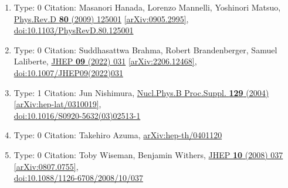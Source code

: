 \documentclass[a4paper,10pt]{article}
\begin{document}
\begin{enumerate}
\begin{enumerate}
  \item Type: 0 Citation: Masanori Hanada, Lorenzo Mannelli, Yoshinori Matsuo, \href{https://www.doi.org/10.1103/PhysRevD.80.125001}{Phys.Rev.D {\bf 80} (2009) 125001}  \href{https://arxiv.org/abs/0905.2995}{[arXiv:0905.2995]},\\\href{https://www.doi.org/10.1103/PhysRevD.80.125001}{doi:10.1103/PhysRevD.80.125001}
  \item Type: 0 Citation: Suddhasattwa Brahma, Robert Brandenberger, Samuel Laliberte, \href{https://www.doi.org/10.1007/JHEP09(2022)031}{JHEP {\bf 09} (2022) 031}  \href{https://arxiv.org/abs/2206.12468}{[arXiv:2206.12468]},\\\href{https://www.doi.org/10.1007/JHEP09(2022)031}{doi:10.1007/JHEP09(2022)031}
  \item Type: 1 Citation: Jun Nishimura, \href{https://www.doi.org/10.1016/S0920-5632(03)02513-1}{Nucl.Phys.B Proc.Suppl. {\bf 129} (2004) }  \href{https://arxiv.org/abs/hep-lat/0310019}{[arXiv:hep-lat/0310019]},\\\href{https://www.doi.org/10.1016/S0920-5632(03)02513-1}{doi:10.1016/S0920-5632(03)02513-1}
  \item Type: 0 Citation: Takehiro Azuma, \href{https://arxiv.org/abs/hep-th/0401120}{arXiv:hep-th/0401120}
  \item Type: 0 Citation: Toby Wiseman, Benjamin Withers, \href{https://www.doi.org/10.1088/1126-6708/2008/10/037}{JHEP {\bf 10} (2008) 037}  \href{https://arxiv.org/abs/0807.0755}{[arXiv:0807.0755]},\\\href{https://www.doi.org/10.1088/1126-6708/2008/10/037}{doi:10.1088/1126-6708/2008/10/037}

\end{enumerate}
\end{enumerate}
\end{document}
